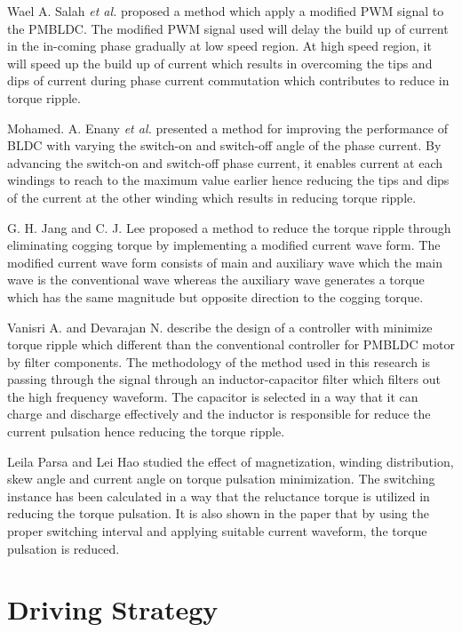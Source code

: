 Wael A. Salah \textit{et al.} \citep{7648} proposed a method which apply a modified PWM signal to the PMBLDC. The modified PWM signal used will delay the build up of current in the in-coming phase gradually at low speed region. At high speed region, it will speed up the build up of current which results in overcoming the tips and dips of current during phase current commutation which contributes to reduce in torque ripple.

Mohamed. A. Enany \textit{et al.} \citep{285} presented a method for improving the performance of BLDC with varying the switch-on and switch-off angle of the phase current. By advancing the switch-on and switch-off phase current, it enables current at each windings to reach to the maximum value earlier hence reducing the tips and dips of the current at the other winding which results in reducing torque ripple.

G. H. Jang and C. J. Lee \citep{08305} proposed a method to reduce the torque ripple through eliminating cogging torque by implementing a modified current wave form. The modified current wave form consists of main and auxiliary wave which the main wave is the conventional wave whereas the auxiliary wave generates a torque which has the same magnitude but opposite direction to the cogging torque.

Vanisri A. and Devarajan N. \citep{1450216} describe the design of a controller with minimize torque ripple which different than the conventional controller for PMBLDC motor by filter components. The methodology of the method used in this research is passing through the signal through an inductor-capacitor filter which filters out the high frequency waveform. The capacitor is selected in a way that it can charge and discharge effectively and the inductor is responsible for reduce the current pulsation hence reducing the torque ripple.

Leila Parsa and Lei Hao \citep{04435197} studied the effect of magnetization, winding distribution, skew angle and current angle on torque pulsation minimization. The switching instance has been calculated in a way that the reluctance torque is utilized in reducing the torque pulsation. It is also shown in the paper that by using the proper switching interval and applying suitable current waveform, the torque pulsation is reduced. 

\section{Driving Strategy}

